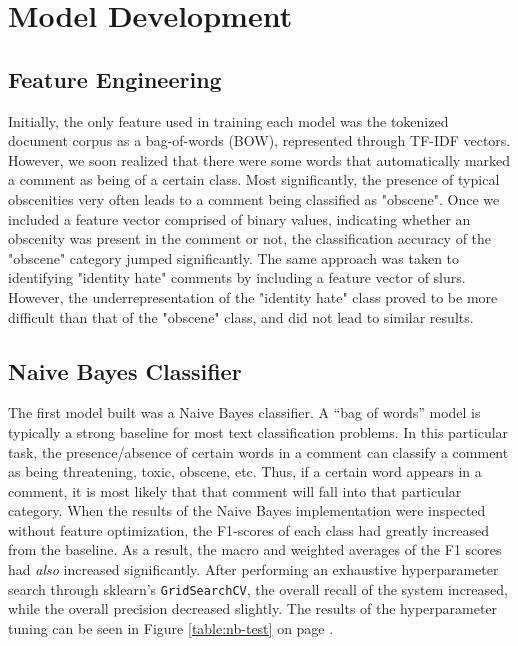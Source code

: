 \documentclass{article}
\begin{document}
\section{Model Development}{
  \subsection{Feature Engineering}{
	  Initially, the only feature used in training each model was the tokenized
	  document corpus as a bag-of-words (BOW), represented through TF-IDF vectors.
	  However, we soon realized that there were some words that automatically
	  marked a comment as being of a certain class. Most significantly, the
	  presence of typical obscenities very often leads to a comment being
	  classified as "obscene". Once we included a feature vector comprised of
	  binary values, indicating whether an obscenity was present in the comment or
	  not, the classification accuracy of the "obscene" category jumped
	  significantly. The same approach was taken to identifying "identity hate"
	  comments by including a feature vector of slurs. However, the
	  underrepresentation of the "identity hate" class proved to be more difficult
	  than that of the "obscene" class, and did not lead to similar results.
  }
  \subsection{Naive Bayes Classifier}{
	  The first model built was a Naive Bayes classifier. A “bag of words” model
	  is typically a strong baseline for most text classification problems. In
	  this particular task, the presence/absence of certain words in a comment can
	  classify a comment as being threatening, toxic, obscene, etc. Thus, if a
	  certain word appears in a comment, it is most likely that that comment will
	  fall into that particular category. When the results of the Naive Bayes
	  implementation were inspected without feature optimization, the F1-scores of
	  each class had greatly increased from the baseline. As a result, the macro
	  and weighted averages of the F1 scores had \textit{also} increased
	  significantly. After performing an exhaustive hyperparameter search through
	  sklearn's \texttt{GridSearchCV}, the overall recall of the system increased,
	  while the overall precision decreased slightly. The results of the
	  hyperparameter tuning can be seen in Figure \ref{table:nb-test} on page
	  \pageref{table:nb-test}.

}}
\end{document}
